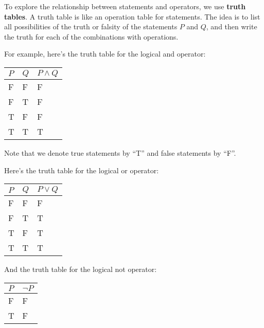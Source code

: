 To explore the relationship between statements and operators, we use \textbf{truth tables}. A truth table is like an operation table for statements. The idea is to list all possibilities of the truth or falsity of the statements $P$ and $Q$, and then write the truth for each of the combinations with operations.

For example, here's the truth table for the logical and operator:
\begin{table}[h]
    \centering
    \begin{tabular}{|l|l||l|}
        \hline
        $P$ & $Q$ & $P\land Q$ \\ \hline
        F   & F   & F          \\ \hline
        F   & T   & F          \\ \hline
        T   & F   & F          \\ \hline
        T   & T   & T          \\ \hline
    \end{tabular}
\end{table}

Note that we denote true statements by ``T'' and false statements by ``F''.

Here's the truth table for the logical or operator:
\begin{table}[h]
    \centering
    \begin{tabular}{|l|l||l|}
        \hline
        $P$ & $Q$ & $P\lor Q$ \\ \hline
        F   & F   & F         \\ \hline
        F   & T   & T         \\ \hline
        T   & F   & T         \\ \hline
        T   & T   & T         \\ \hline
    \end{tabular}
\end{table}

And the truth table for the logical not operator:
\begin{table}[h]
    \centering
    \begin{tabular}{|l||l|}
        \hline
        $P$ & $\lnot P$ \\ \hline
        F   & F         \\ \hline
        T   & F         \\ \hline
    \end{tabular}
\end{table}

